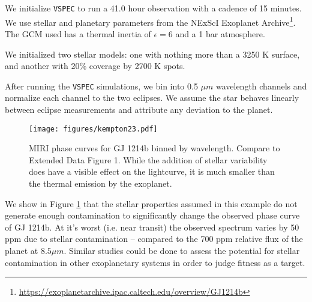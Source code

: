 \documentclass[twocolumn]{aastex631}
\newcommand{\vspec}[1]{\texttt{VSPEC}#1}
\begin{document}
We initialize \vspec{} to run a 41.0 hour observation with a cadence of 15 minutes. We use stellar and planetary parameters
from the NExScI Exoplanet Archive\footnote{\url{https://exoplanetarchive.ipac.caltech.edu/overview/GJ1214b}}.
The GCM used has a thermal inertia of $\epsilon = 6$ and a 1 bar  atmosphere.

We initialized two stellar models: one with nothing more than a 3250 K surface, and another with 20\% coverage by 2700 K spots.

After running the \vspec{} simulations, we bin into 0.5 $\mu m$ wavelength channels and normalize each channel to the two eclipses.
We assume the star behaves linearly between eclipse measurements and attribute any deviation to the planet.

\begin{figure}
    \centering
    \texttt{[image: figures/kempton23.pdf]}
    \caption{
        MIRI phase curves for GJ 1214b binned by wavelength. Compare to \citet{kempton2023} Extended Data Figure 1.
        While the addition of stellar variability does have a visible effect on the lightcurve, it is much smaller than the thermal emission by the exoplanet.
        }
    \label{fig:gj1214b}
\end{figure}

We show in Figure \ref{fig:gj1214b} that the stellar properties assumed in this example do not generate enough contamination to
significantly change the observed phase curve of GJ 1214b. At it's worst (i.e. near transit) the observed spectrum varies by 50 ppm due to stellar
contamination -- compared to the 700 ppm relative flux of the planet at $8.5 {\mu m}$. Similar studies could be done to assess the potential for
stellar contamination in other exoplanetary systems in order to judge fitness as a target.

\end{document}
